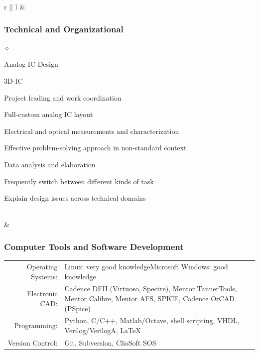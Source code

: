 \documentclass[a4paper]{article}
\newlength{\sectsep}
\newlength{\subsectsep}
\renewenvironment{itemize}{
  \begin{list}{$\diamond$}{
    \setlength{\topsep}{0.25em}
    \setlength{\itemsep}{0em}
    \setlength{\parskip}{0pt}
    \setlength{\parsep}{0em}
  }
}{
  \end{list}
}
\begin{document}
\begin{longtable}{r || l}
  & \begin{minipage}{0.9\textwidth}
      \vspace{\subsectsep}
      \subsubsection*{Technical and Organizational}
      \begin{itemize}
          \item Analog IC Design
          \item 3D-IC
          \item Project leading and work coordination
          \item Full-custom analog IC layout
          \item Electrical and optical measurements and characterization
          \item Effective problem-solving approach in non-standard context
          \item Data analysis and elaboration
          \item Frequently switch between different kinds of task
          \item Explain design issues across technical domains
      \end{itemize}
  \end{minipage} \\[\sectsep]

  & \begin{minipage}{0.9\textwidth}
      \vspace{\subsectsep}
      \subsubsection*{Computer Tools and Software Development}
      \begin{tabular*}{\textwidth}{r p{}}
        Operating Systems:&{Linux: very good knowledge\newline Microsoft Windows: good knowledge}\\[0.5ex]
        Electronic CAD:&Cadence DFII (Virtuoso, Spectre), Mentor TannerTools, Mentor Calibre, Mentor AFS, SPICE, Cadence OrCAD (PSpice)\\[0.5ex]
        Programming:&Python, C/C++, Matlab/Octave, shell scripting, VHDL, Verilog/VerilogA, {\fontfamily{arial}\selectfont\LaTeX}\\[0.5ex]
        Version Control:&Git, Subversion, ClioSoft SOS
      \end{tabular*}\\
  \end{minipage} \\[\sectsep]


\end{longtable}
\end{document}
